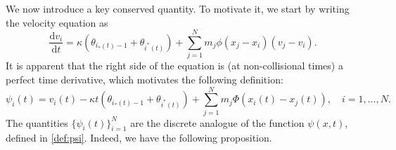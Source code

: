 \documentclass[10pt,a4paper]{amsart}
\def\dd{\mathrm{d}}
\begin{document}
	We now introduce a key conserved quantity.  To motivate it, we start by writing the velocity equation as  
	\begin{equation}
		\label{e:vi2}
		\frac{\dd v_i}{\dd t} = \kappa( \theta_{i_*(t)-1} + \theta_{i^*(t)} ) + \sum_{j=1}^N m_j \phi(x_j - x_i) (v_j - v_i).
	\end{equation}
	It is apparent that the right side of the equation is (at non-collisional times) a perfect time derivative, which motivates the following definition:
	\begin{equation}\label{def:psiit}
		\psi_i(t) = v_i(t) - \kappa t (\theta_{i_*(t)-1}+\theta_{i^*(t)})  + \sum_{j=1}^N m_j \Phi(x_i(t) - x_j(t)),\quad i=1,\ldots,N.
	\end{equation}
	The quantities $\{\psi_i(t)\}_{i=1}^N$ are the discrete analogue of the function $\psi(x,t)$, defined in \eqref{def:psi}. Indeed, we have the following proposition.
	
\end{document}
